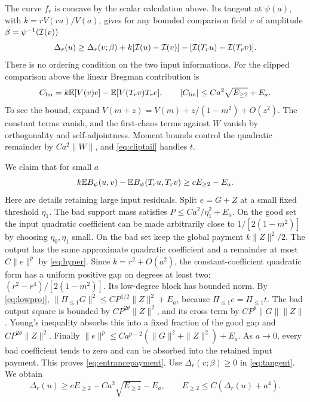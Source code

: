 The curve $f_r$ is concave by the scalar calculation above. Its tangent
at $\psi(a)$, with $k=rV(ra)/V(a)$, gives for any bounded comparison
field $v$ of amplitude $\beta=\psi^{-1}(\mathcal I(v))$
\begin{equation}\label{eq:tangent}
 \Delta_r(u)\ge\Delta_r(v;\beta)
 +k[\mathcal I(u)-\mathcal I(v)]-[\mathcal I(T_ru)-\mathcal I(T_rv)].
\end{equation}
There is no ordering condition on the two input informations.
For the clipped comparison above the linear Bregman contribution is
\[
 C_{\rm lin}=k\mathbb E[V(v)e]-\mathbb E[V(T_rv)T_re],\qquad
 |C_{\rm lin}|\le Ca^2\sqrt{E_{\ge2}}+E_a.
\]
To see the bound, expand $V(m+z)=V(m)+z/(1-m^2)+O(z^2)$.
The constant terms vanish, and the first-chaos terms against $W$
vanish by orthogonality and self-adjointness. Moment bounds control the
quadratic remainder by $Ca^2\|W\|$, and \eqref{eq:cliptail} handles $t$.

We claim that for small $a$
\begin{equation}\label{eq:entrancepayment}
 k\mathbb E B_\psi(u,v)-\mathbb E B_\psi(T_ru,T_rv)
 \ge cE_{\ge2}-E_a.
\end{equation}
Here are details retaining large input residuals. Split $e=G+Z$ at a
small fixed threshold $\eta_1$. The bad support mass satisfies
$P\le Ca^2/\eta_1^2+E_a$. On the good set the input quadratic
coefficient can be made arbitrarily close to $1/[2(1-m^2)]$ by choosing
$\eta_0,\eta_1$ small. On the bad set keep the global payment
$k\|Z\|^2/2$. The output has the same approximate quadratic coefficient
and a remainder at most $C\|e\|^p$ by \eqref{eq:hyper}.
Since $k=r^2+O(a^2)$, the constant-coefficient quadratic form has a
uniform positive gap on degrees at least two:
$(r^2-r^4)/[2(1-m^2)]$.
Its low-degree block has bounded norm. By \eqref{eq:lowproj},
$\|\Pi_{\le1}G\|^2\le CP^{1/2}\|Z\|^2+E_a$, because
$\Pi_{\le1}e=\Pi_{\le1}t$.
The bad output square is bounded by $CP^{2\theta}\|Z\|^2$,
and its cross term by $CP^\theta\|G\|\|Z\|$.
Young's inequality absorbs this into a fixed fraction of the good gap
and $CP^{2\theta}\|Z\|^2$.
Finally $\|e\|^p\le Ca^{p-2}(\|G\|^2+\|Z\|^2)+E_a$.
As $a\to0$, every bad coefficient tends to zero and can be absorbed
into the retained input payment. This proves \eqref{eq:entrancepayment}.
Use $\Delta_r(v;\beta)\ge0$ in \eqref{eq:tangent}. We obtain
\begin{equation}\label{eq:entrance}
 \Delta_r(u)\ge cE_{\ge2}-Ca^2\sqrt{E_{\ge2}}-E_a,
 \qquad E_{\ge2}\le C(\Delta_r(u)+a^4).
\end{equation}

